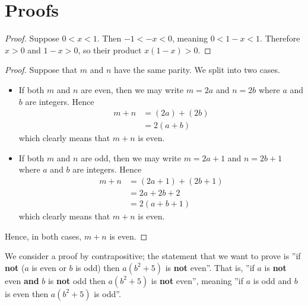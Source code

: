 \section{Proofs}
\begin{questions}
    \item \begin{proof}
        Suppose $0 < x < 1$. Then $-1 < -x < 0$, meaning $0 < 1 - x < 1$. Therefore $x > 0$ and $1-x > 0$, so their product $x(1-x) > 0$.
    \end{proof}
    
    \item \begin{proof}
        Suppose that $m$ and $n$ have the same parity. We split into two cases.
        \begin{itemize}
            \item If both $m$ and $n$ are even, then we may write $m = 2a$ and $n = 2b$ where $a$ and $b$ are integers. Hence
            \begin{align*}
                m + n &= (2a) + (2b) \\
                &= 2(a+b)
            \end{align*}
            which clearly means that $m + n$ is even.
            \item If both $m$ and $n$ are odd, then we may write $m = 2a + 1$ and $n = 2b + 1$ where $a$ and $b$ are integers. Hence
            \begin{align*}
                m + n &= (2a + 1) + (2b + 1)\\
                &= 2a + 2b + 2\\
                &= 2(a + b + 1)
            \end{align*}
            which clearly means that $m+n$ is even.
        \end{itemize}
        Hence, in both cases, $m + n$ is even.
    \end{proof}

    \item We consider a proof by contrapositive; the statement that we want to prove is ''if \textbf{not} ($a$ is even or $b$ is odd) then $a(b^2+5)$ is \textbf{not} even''. That is, ''if $a$ is \textbf{not} even \textbf{and} $b$ is \textbf{not} odd then $a(b^2+5)$ is \textbf{not} even'', meaning ''if $a$ is odd and $b$ is even then $a(b^2+5)$ is odd''.
    

\end{questions}
